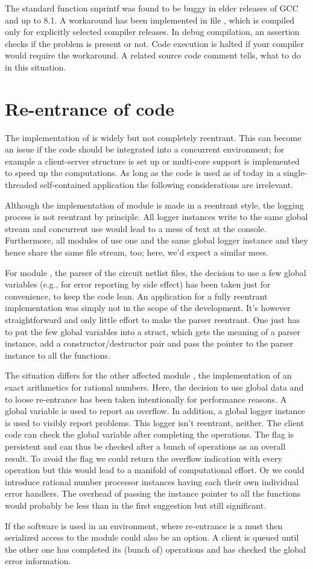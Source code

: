 The standard function snprintf was found to be buggy in elder releases of
GCC and up to 8.1. A workaround has been implemented in file
, which is compiled only for explicitly selected compiler
releases. In debug compilation, an assertion checks if the problem is
present or not. Code execution is halted if your compiler would require
the workaround. A related source code comment tells, what to do in this
situation.

\section{Re-entrance of code}

The implementation of \linnet{} is widely but not completely reentrant.
This can become an issue if the code should be integrated into a
concurrent environment; for example a client-server structure is set up or
multi-core support is implemented to speed up the computations. As long as
the code is used as of today in a single-threaded self-contained
application the following considerations are irrelevant.

Although the implementation of module  is made in a
reentrant style, the logging process is not reentrant by principle. All
logger instances write to the same global stream  and
concurrent use would lead to a mess of text at the console. Furthermore,
all modules of \linnet{} use one and the same global logger instance and
they hence share the same file stream, too; here, we'd expect a similar
mess.

For module , the parser of the circuit netlist
files, the decision to use a few global variables (e.g., for error
reporting by side effect) has been taken just for convenience, to keep the
code lean. An application for a fully reentrant implementation was simply
not in the scope of the development. It's however straightforward and only
little effort to make the parser reentrant. One just has to put the few
global variables into a struct, which gets the meaning of a parser
instance, add a constructor/destructor pair and pass the pointer to the
parser instance to all the functions.

The situation differs for the other affected module
, the implementation of an exact arithmetics
for rational numbers. Here, the decision to use global data and to loose
re-entrance has been taken intentionally for performance reasons. A global
variable is used to report an overflow. In addition, a global logger
instance is used to visibly report problems. This logger isn't reentrant,
neither. The client code can check the global variable after completing
the operations. The flag is persistent and can thus be checked after a
bunch of operations as an overall result. To avoid the flag we could
return the overflow indication with every operation but this would lead to
a manifold of computational effort. Or we could introduce rational number
processor instances having each their own individual error handlers. The
overhead of passing the instance pointer to all the functions would
probably be less than in the first suggestion but still significant.

If the software is used in an environment, where re-entrance is a must then
serialized access to the module could also be an option. A client is
queued until the other one has completed its (bunch of) operations and has
checked the global error information.